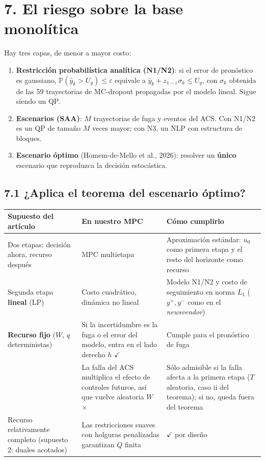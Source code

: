 \documentclass[11pt,a4paper]{article}
\begin{document}
\medskip
\section*{7. El riesgo sobre la base monolítica}
Hay tres capas, de menor a mayor costo:

\begin{enumerate}
\item \textbf{Restricción probabilística analítica (N1/N2)}: si el error de pronóstico es gaussiano, $\mathbb P(\hat y_k>U_y)\le\varepsilon$ equivale a $\bar y_k+z_{1-\varepsilon}\sigma_k\le U_y$, con $\sigma_k$ obtenida de las 59 trayectorias de MC-dropout propagadas por el modelo lineal. Sigue siendo un QP.
\item \textbf{Escenarios (SAA)}: $M$ trayectorias de fuga y eventos del ACS. Con N1/N2 es un QP de tamaño $M$ veces mayor; con N3, un NLP con estructura de bloques.
\item \textbf{Escenario óptimo} (Homem-de-Mello et al., 2026): resolver un \textbf{único} escenario que reproduzca la decisión estocástica.
\end{enumerate}

\subsection*{7.1 ¿Aplica el teorema del escenario óptimo?}
{\small
\begin{xltabular}{\linewidth}{@{}YYY@{}}
\toprule
\textbf{Supuesto del artículo} & \textbf{En nuestro MPC} & \textbf{Cómo cumplirlo} \\
\midrule
\endhead
Dos etapas: decisión ahora, recurso después & MPC multietapa & Aproximación estándar: $u_0$ como primera etapa y el resto del horizonte como recurso \\
Segunda etapa \textbf{lineal} (LP) & Costo cuadrático, dinámica no lineal & Modelo N1/N2 y costo de seguimiento en norma $L_1$ ($y^+,y^-$ como en el \emph{newsvendor}) \\
\textbf{Recurso fijo} ($W$, $q$ deterministas) & Si la incertidumbre es la fuga o el error del modelo, entra en el lado derecho $h$ $\checkmark$ & Cumple para el pronóstico de fuga \\
 & La falla del ACS multiplica el efecto de controles futuros, así que vuelve aleatoria $W$ $\times$ & Sólo admisible si la falla afecta a la primera etapa ($T$ aleatoria, caso ii del teorema); si no, queda fuera del teorema \\
Recurso relativamente completo (supuesto 2: duales acotados) & Las restricciones suaves con holguras penalizadas garantizan $Q$ finita & $\checkmark$ por diseño \\
\bottomrule
\end{xltabular}}
\end{document}
